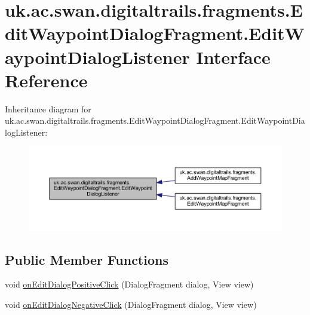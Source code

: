 \hypertarget{interfaceuk_1_1ac_1_1swan_1_1digitaltrails_1_1fragments_1_1_edit_waypoint_dialog_fragment_1_1_edit_waypoint_dialog_listener}{\section{uk.\+ac.\+swan.\+digitaltrails.\+fragments.\+Edit\+Waypoint\+Dialog\+Fragment.\+Edit\+Waypoint\+Dialog\+Listener Interface Reference}
\label{interfaceuk_1_1ac_1_1swan_1_1digitaltrails_1_1fragments_1_1_edit_waypoint_dialog_fragment_1_1_edit_waypoint_dialog_listener}
}


Inheritance diagram for uk.\+ac.\+swan.\+digitaltrails.\+fragments.\+Edit\+Waypoint\+Dialog\+Fragment.\+Edit\+Waypoint\+Dialog\+Listener\+:\nopagebreak
\begin{figure}[H]
\begin{center}
\leavevmode
\includegraphics[width=350pt]{interfaceuk_1_1ac_1_1swan_1_1digitaltrails_1_1fragments_1_1_edit_waypoint_dialog_fragment_1_1_ed8f84049a2f0e940543fade4cc6b402dd}
\end{center}
\end{figure}
\subsection*{Public Member Functions}
\begin{DoxyCompactItemize}
\item 
void \hyperlink{interfaceuk_1_1ac_1_1swan_1_1digitaltrails_1_1fragments_1_1_edit_waypoint_dialog_fragment_1_1_edit_waypoint_dialog_listener_a2fe2b638cb6d20f439378c5f5b87508d}{on\+Edit\+Dialog\+Positive\+Click} (Dialog\+Fragment dialog, View view)
\item 
void \hyperlink{interfaceuk_1_1ac_1_1swan_1_1digitaltrails_1_1fragments_1_1_edit_waypoint_dialog_fragment_1_1_edit_waypoint_dialog_listener_a990bd023f41835e39430309ff3398e00}{on\+Edit\+Dialog\+Negative\+Click} (Dialog\+Fragment dialog, View view)
\end{DoxyCompactItemize}


